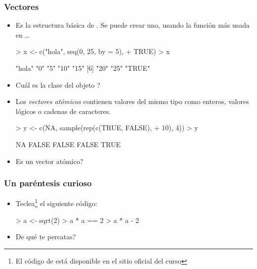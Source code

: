 \begin{frame}
  \frametitle{Vectores}
  \begin{itemize}
  \item Es la estructura b\'asica de . Se puede crear uno, usando la funci\'on \alert{m\'as} usada en  \ldots {} 
\begin{Schunk}
\begin{Sinput}
> x <- c("hola", seq(0, 25, by = 5), 
+     TRUE)
> x
\end{Sinput}
\begin{Soutput}
[1] "hola" "0"    "5"    "10"   "15"  
[6] "20"   "25"   "TRUE"
\end{Soutput}
\end{Schunk}
  \item \textquestiondown Cu\'al es la clase del objeto ?
  \item Los \emph{vectores at\'omicos} contienen valores del mismo tipo como enteros, valores l\'ogicos o cadenas de caracteres.
\begin{Schunk}
\begin{Sinput}
> y <- c(NA, sample(rep(c(TRUE, FALSE), 
+     10), 4))
> y
\end{Sinput}
\begin{Soutput}
[1]    NA FALSE FALSE FALSE  TRUE
\end{Soutput}
\end{Schunk}
  \item \textquestiondown Es  un vector at\'omico?
  \end{itemize}
\end{frame}

\begin{frame}
  \frametitle{Un par\'entesis curioso}
  \begin{itemize}
  \item Teclea\footnote{El c\'odigo de  est\'a disponible en el sitio oficial del curso} el siguiente c\'odigo:
\begin{Schunk}
\begin{Sinput}
> a <- sqrt(2)
> a * a == 2
> a * a - 2
\end{Sinput}
\end{Schunk}
  \item \textquestiondown De qu\'e te percatas?
  \end{itemize}
\end{frame}


